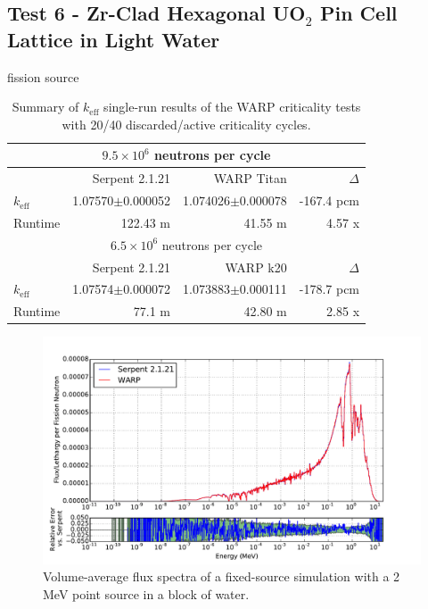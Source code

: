 \documentclass[preprint,12pt]{elsarticle}
\begin{document}
\subsection{Test 6 - Zr-Clad Hexagonal UO$_2$ Pin Cell Lattice in Light Water}

fission source

\begin{table}[h]
\centering
\caption{Summary of $k_\mathrm{eff}$ single-run results of the WARP criticality tests with 20/40 discarded/active criticality cycles.}
\label{assembly-lw_table}
\small
\begin{tabular}{| l | r | r | r |}
\hline
\multicolumn{4}{|c|}{$9.5\times10^6$ neutrons per cycle} \\
\hline
                  & Serpent 2.1.21       & WARP Titan               & $\Delta$ \\
\hline
$k_\mathrm{eff}$  & 1.07570$\pm$0.000052 & 1.074026$\pm$0.000078         & -167.4 pcm \\
\hline
Runtime           & 122.43 m             & 41.55 m                  & 4.57 x \\
\hline
\hline
\multicolumn{4}{|c|}{$6.5\times10^6$ neutrons per cycle} \\
\hline
                  & Serpent 2.1.21       & WARP k20            & $\Delta$ \\
\hline
$k_\mathrm{eff}$  & 1.07574$\pm$0.000072 & 1.073883$\pm$0.000111    & -178.7 pcm \\
\hline
Runtime           & 77.1 m             & 42.80 m             & 2.85 x\\
\hline
\end{tabular}
\end{table}


\begin{figure}[h!]
\centering
\includegraphics[width=\textwidth,trim= 1cm 0cm 1cm 0cm]{graphics/assembly-lw_spec.pdf}
\caption{Volume-average flux spectra of a fixed-source simulation with a 2 MeV point source in a block of water. \label{assembly-lw_spec} }
\end{figure}
\end{document}
